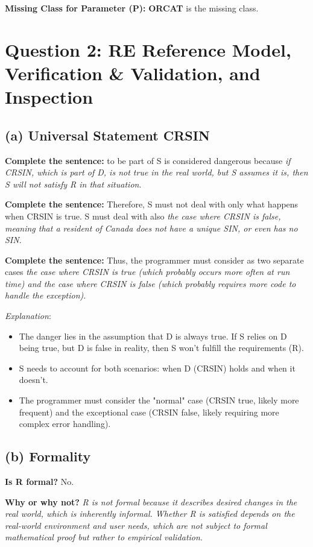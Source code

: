 \documentclass{article}
\begin{document}
\textbf{Missing Class for Parameter (P):} \textbf{ORCAT} is the missing class.

\section*{Question 2: RE Reference Model, Verification \& Validation, and Inspection}

\subsection*{(a) Universal Statement CRSIN}

\textbf{Complete the sentence:} to be part of S is considered dangerous because \textit{if CRSIN, which is part of D, is not true in the real world, but S assumes it is, then S will not satisfy R in that situation}.

\textbf{Complete the sentence:} Therefore, S must not deal with only what happens when CRSIN is true. S must deal with also \textit{the case where CRSIN is false, meaning that a resident of Canada does not have a unique SIN, or even has no SIN}.

\textbf{Complete the sentence:} Thus, the programmer must consider as two separate cases \textit{the case where CRSIN is true (which probably occurs more often at run time) and the case where CRSIN is false (which probably requires more code to handle the exception)}.

\textit{Explanation}:
\begin{itemize}
    \item The danger lies in the assumption that D is always true. If S relies on D being true, but D is false in reality, then S won't fulfill the requirements (R).
    \item S needs to account for both scenarios: when D (CRSIN) holds and when it doesn't.
    \item The programmer must consider the "normal" case (CRSIN true, likely more frequent) and the exceptional case (CRSIN false, likely requiring more complex error handling).
\end{itemize}

\subsection*{(b) Formality}

\textbf{Is R formal?} No.

\textbf{Why or why not?} \textit{R is not formal because it describes desired changes in the real world, which is inherently informal. Whether R is satisfied depends on the real-world environment and user needs, which are not subject to formal mathematical proof but rather to empirical validation.}
\end{document}
